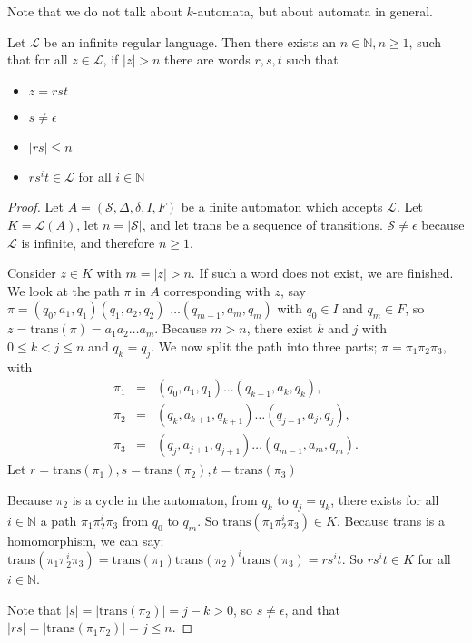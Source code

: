 \documentclass{article}
\begin{document}
Note that we do not talk about $k$-automata, but about automata in general.

\begin{lemma} \label{lem:pumping}
Let $\mathcal{L}$ be an infinite regular language. Then there exists an 
$n \in \mathbb{N}, n \ge 1$, such that for all $z \in \mathcal{L}$, if 
$|z| > n$ there are words $r, s, t$ such that
\begin{itemize}
\item $z = rst$
\item $s \ne \epsilon$
\item $|rs| \le n$
\item $r s^i t \in \mathcal{L}$ for all $i \in \mathbb{N}$ 
\end{itemize}
\end{lemma}

\begin{proof}
Let $A = (\mathcal{S}, \Delta, \delta, I, F)$ be a finite automaton which 
accepts $\mathcal{L}$. Let $K = \mathcal{L}(A)$, let $n = |\mathcal{S}|$, and 
let trans be a sequence of transitions. $\mathcal{S} \ne \epsilon$ because 
$\mathcal{L}$ is infinite, and therefore $n \ge 1$.

Consider $z \in K$ with $m = |z| > n$. If such a word does not exist, we are
finished. We look at the path $\pi$ in $A$ corresponding with $z$, say
$\pi = (q_0, a_1, q_1)(q_1, a_2, q_2)$ $\ldots(q_{m - 1}, a_m, q_m)$ with
$q_0 \in I$ and $q_m \in F$, so $z = \mathrm{trans}(\pi) = a_1a_2\ldots a_m$.
Because $m > n$, there exist $k$ and $j$ with $0 \le k < j \le n$ and
$q_k = q_j$. We now split the path into three parts; $\pi = \pi_1 \pi_2 \pi_3$,
with
\begin{eqnarray*}
  \pi_1 &=& (q_0, a_1, q_1) \ldots (q_{k - 1}, a_k, q_k),\\
  \pi_2 &=& (q_k, a_{k + 1}, q_{k + 1}) \ldots (q_{j - 1}, a_j, q_j),\\
  \pi_3 &=& (q_j, a_{j + 1}, q_{j + 1}) \ldots (q_{m - 1}, a_m, q_m).
\end{eqnarray*}
Let $r = \mathrm{trans}(\pi_1), s = \mathrm{trans}(\pi_2),
     t = \mathrm{trans}(\pi_3)$

Because $\pi_2$ is a cycle in the automaton, from $q_k$ to $q_j = q_k$, there
exists for all $i \in \mathbb{N}$ a path $\pi_1 \pi_2^i \pi_3$ from $q_0$ to
$q_m$. So $\mathrm{trans}(\pi_1 \pi_2^i \pi_3) \in K$. Because trans is a
homomorphism, we can say:  $\mathrm{trans}(\pi_1 \pi_2^i \pi_3) =
\mathrm{trans}(\pi_1) \mathrm{trans}(\pi_2)^i \mathrm{trans}(\pi_3) = r s^i t$.
So $r s^i t \in K$ for all $i \in \mathbb{N}$.

Note that $|s| = |\mathrm{trans}(\pi_2)| = j - k > 0$, so $s \ne \epsilon$,
and that $|rs| = |\mathrm{trans}(\pi_1 \pi_2)| = j \le n$. 
\end{proof}
\end{document}
